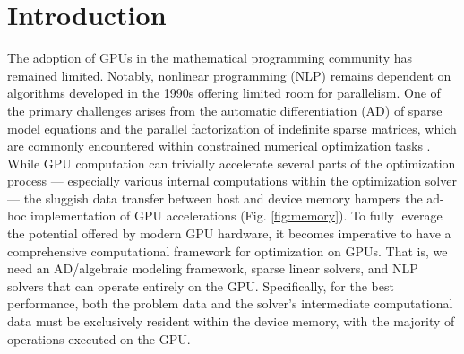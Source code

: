 \section{Introduction}

The adoption of GPUs in the mathematical programming community has remained
limited. Notably, nonlinear programming (NLP) remains dependent on
algorithms developed in the 1990s offering limited room for parallelism.
One of the primary challenges arises from the
automatic differentiation (AD) of sparse model equations and the
parallel factorization of indefinite sparse matrices, which are
commonly encountered within constrained numerical optimization tasks
\cite{anitescu2021targeting}. While GPU computation can trivially
accelerate several parts of the optimization process --- especially
various internal computations within the optimization solver --- the
sluggish data transfer between host and device memory hampers the
ad-hoc implementation of GPU accelerations (Fig. \ref{fig:memory}). To
fully leverage the potential offered by modern GPU hardware, it
becomes imperative to have a comprehensive computational framework for
optimization on GPUs. That is, we need an AD/algebraic
modeling framework, sparse linear solvers, and NLP solvers that can
operate entirely on the GPU. Specifically, for the best performance,
both the problem data and the solver's intermediate computational data
must be exclusively resident within the device memory, with the
majority of operations executed on the GPU.


